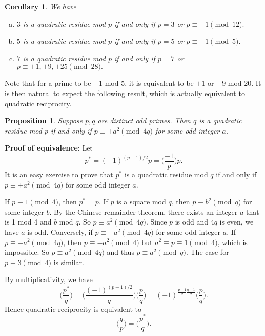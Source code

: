 \documentclass{article}
\newtheorem{cor}[subsection]{Corollary}
\newtheorem{proposition}[subsection]{Proposition}
\renewcommand{\lg}[2]{\Big(\frac{#1}{#2}\Big)}
\begin{document}
\begin{cor} We have
    \begin{enumerate}[(a)]
        \item $3$ is a quadratic residue mod $p$ if and only if $p = 3$ or $p\equiv \pm1\pmod{12}.$
        \item $5$ is a quadratic residue mod $p$ if and only if $p = 5$ or $p\equiv \pm1\pmod{5}.$
        \item $7$ is a quadratic residue mod $p$ if and only if $p = 7$ or $p\equiv \pm1, \pm9, \pm25\pmod{28}.$
    \end{enumerate} 
\end{cor}
Note that for a prime to be $\pm1$ mod $5$, it is equivalent to be $\pm1$ or  $\pm9$ mod $20$. It is then natural to expect the following result, which is actually equivalent to quadratic reciprocity.

\begin{proposition}\label{prop:qr2}
    Suppose $p,q$ are distinct odd primes. Then $q$ is a quadratic residue mod $p$ if and only if $p\equiv \pm a^2\pmod{4q}$ for some odd integer $a$.
\end{proposition}

\noindent\textbf{Proof of equivalence}: Let $$p^* = (-1)^{(p-1)/2}p = \lg{-1}{p}p.$$ It is an easy exercise to prove that $p^*$ is a quadratic residue mod $q$ if and only if $p\equiv \pm a^2\pmod{4q}$ for some odd integer $a$. 

If $p\equiv 1\pmod{4}$, then $p^* = p$. If $p$ is a square mod $q$, then $p\equiv b^2\pmod{q}$ for some integer $b$. By the Chinese remainder theorem, there exists an integer $a$ that is 1 mod 4 and $b$ mod $q$. So $p\equiv a^2\pmod{4q}$. Since $p$ is odd and $4q$ is even, we have $a$ is odd. Conversely, if $p\equiv \pm a^2\pmod{4q}$ for some odd integer $a$. If $p\equiv -a^2\pmod{4q}$, then $p\equiv -a^2\pmod{4}$ but $a^2\equiv p \equiv 1\pmod{4}$, which is impossible. So $p\equiv a^2\pmod{4q}$ and thus $p\equiv a^2\pmod{q}$. The case for $p\equiv 3\pmod{4}$ is similar. 

By multiplicativity, we have
$$\lg{p^*}{q} = \lg{(-1)^{(p-1)/2}}{q}\lg{p}{q} = (-1)^{\frac{p-1}{2}\frac{q-1}{2}}\lg{p}{q}.$$
Hence quadratic reciprocity is equivalent to $$\lg{q}{p} = \lg{p^*}{q}.$$

\begin{comment}
    In number theory, it is sometimes more natural to take $$q^* = (-1)^{(q-1)/2}q = \lg{-1}{q}q.$$
Then $$\lg{q^*}{p} = \lg{(-1)^{(q-1)/2}}{p}\lg{q}{p} = (-1)^{\frac{p-1}{2}\frac{q-1}{2}}\lg{q}{p}.$$
When expressed in this notation, quadratic reciprocity may be restated as 
\end{comment}
\end{document}
